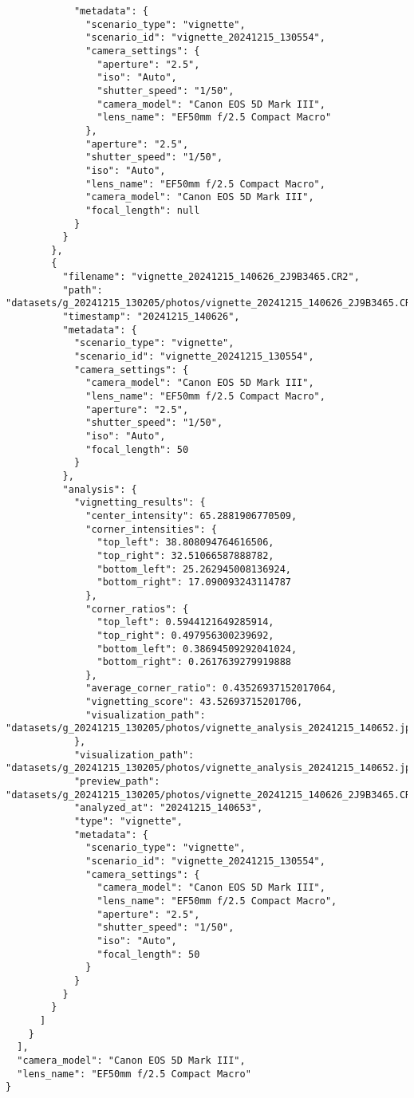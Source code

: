 \documentclass{book}
\begin{document}
\begin{verbatim}
            "metadata": {
              "scenario_type": "vignette",
              "scenario_id": "vignette_20241215_130554",
              "camera_settings": {
                "aperture": "2.5",
                "iso": "Auto",
                "shutter_speed": "1/50",
                "camera_model": "Canon EOS 5D Mark III",
                "lens_name": "EF50mm f/2.5 Compact Macro"
              },
              "aperture": "2.5",
              "shutter_speed": "1/50",
              "iso": "Auto",
              "lens_name": "EF50mm f/2.5 Compact Macro",
              "camera_model": "Canon EOS 5D Mark III",
              "focal_length": null
            }
          }
        },
        {
          "filename": "vignette_20241215_140626_2J9B3465.CR2",
          "path": "datasets/g_20241215_130205/photos/vignette_20241215_140626_2J9B3465.CR2",
          "timestamp": "20241215_140626",
          "metadata": {
            "scenario_type": "vignette",
            "scenario_id": "vignette_20241215_130554",
            "camera_settings": {
              "camera_model": "Canon EOS 5D Mark III",
              "lens_name": "EF50mm f/2.5 Compact Macro",
              "aperture": "2.5",
              "shutter_speed": "1/50",
              "iso": "Auto",
              "focal_length": 50
            }
          },
          "analysis": {
            "vignetting_results": {
              "center_intensity": 65.2881906770509,
              "corner_intensities": {
                "top_left": 38.808094764616506,
                "top_right": 32.51066587888782,
                "bottom_left": 25.262945008136924,
                "bottom_right": 17.090093243114787
              },
              "corner_ratios": {
                "top_left": 0.5944121649285914,
                "top_right": 0.497956300239692,
                "bottom_left": 0.38694509292041024,
                "bottom_right": 0.2617639279919888
              },
              "average_corner_ratio": 0.43526937152017064,
              "vignetting_score": 43.52693715201706,
              "visualization_path": "datasets/g_20241215_130205/photos/vignette_analysis_20241215_140652.jpg"
            },
            "visualization_path": "datasets/g_20241215_130205/photos/vignette_analysis_20241215_140652.jpg",
            "preview_path": "datasets/g_20241215_130205/photos/vignette_20241215_140626_2J9B3465.CR2",
            "analyzed_at": "20241215_140653",
            "type": "vignette",
            "metadata": {
              "scenario_type": "vignette",
              "scenario_id": "vignette_20241215_130554",
              "camera_settings": {
                "camera_model": "Canon EOS 5D Mark III",
                "lens_name": "EF50mm f/2.5 Compact Macro",
                "aperture": "2.5",
                "shutter_speed": "1/50",
                "iso": "Auto",
                "focal_length": 50
              }
            }
          }
        }
      ]
    }
  ],
  "camera_model": "Canon EOS 5D Mark III",
  "lens_name": "EF50mm f/2.5 Compact Macro"
}
\end{verbatim}
\end{document}
